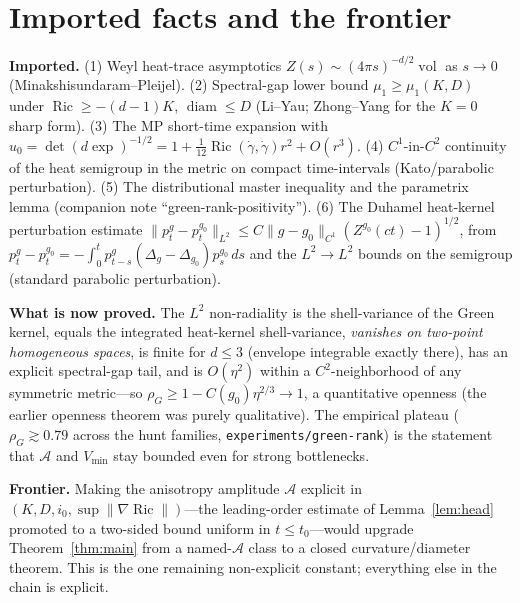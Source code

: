 \documentclass[11pt]{article}
\theoremstyle{remark}
\newcommand{\vol}{\operatorname{vol}}
\newcommand{\diam}{\operatorname{diam}}
\newcommand{\rhoG}{\rho_G}
\DeclareMathOperator{\Ric}{Ric}
\begin{document}
\section{Imported facts and the frontier}
\noindent\textbf{Imported.} (1) Weyl heat-trace asymptotics $Z(s)\sim(4\pi s)^{-d/2}\vol$
as $s\to0$ (Minakshisundaram--Pleijel). (2) Spectral-gap lower bound $\mu_1\ge\mu_1(K,D)$
under $\Ric\ge-(d-1)K$, $\diam\le D$ (Li--Yau; Zhong--Yang for the $K=0$ sharp form). (3) The
MP short-time expansion with $u_0=\det(d\exp)^{-1/2}=1+\tfrac1{12}\Ric(\dot\gamma,\dot\gamma)r^2
+O(r^3)$. (4) $C^1$-in-$C^2$ continuity of the heat semigroup in the metric on compact
time-intervals (Kato/parabolic perturbation). (5) The distributional master inequality and
the parametrix lemma (companion note ``green-rank-positivity''). (6) The Duhamel
heat-kernel perturbation estimate $\lVert p_t^g-p_t^{g_0}\rVert_{L^2}\le C\lVert
g-g_0\rVert_{C^1}(Z^{g_0}(ct)-1)^{1/2}$, from $p_t^g-p_t^{g_0}=-\int_0^t p^g_{t-s}
(\Delta_g-\Delta_{g_0})p^{g_0}_s\,ds$ and the $L^2\!\to\!L^2$ bounds on the semigroup
(standard parabolic perturbation).

\medskip
\noindent\textbf{What is now proved.} The $L^2$ non-radiality is the shell-variance of the
Green kernel, equals the integrated heat-kernel shell-variance, \emph{vanishes on two-point
homogeneous spaces}, is finite for $d\le3$ (envelope integrable exactly there), has an
explicit spectral-gap tail, and is $O(\eta^2)$ within a $C^2$-neighborhood of any symmetric
metric---so $\rhoG\ge1-C(g_0)\eta^{2/3}\to1$, a quantitative openness (the earlier openness
theorem was purely qualitative). The empirical
plateau ($\rhoG\gtrsim0.79$ across the hunt families, \texttt{experiments/green-rank}) is the
statement that $\mathcal A$ and $V_{\min}$ stay bounded even for strong bottlenecks.

\medskip
\noindent\textbf{Frontier.} Making the anisotropy amplitude $\mathcal A$ explicit in
$(K,D,i_0,\sup\lVert\nabla\Ric\rVert)$---the leading-order estimate of Lemma~\ref{lem:head}
promoted to a two-sided bound uniform in $t\le t_0$---would upgrade Theorem~\ref{thm:main}
from a named-$\mathcal A$ class to a closed curvature/diameter theorem. This is the one
remaining non-explicit constant; everything else in the chain is explicit.
\end{document}
